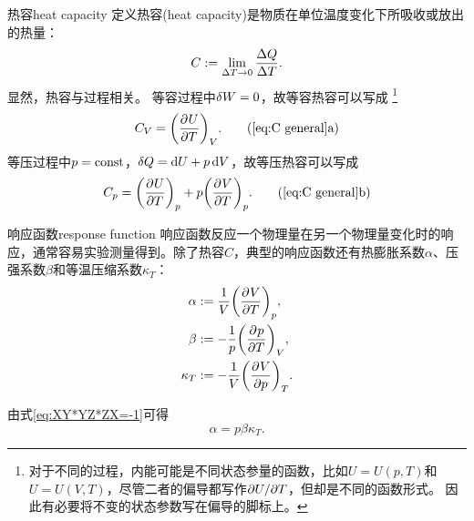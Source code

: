 \begin{definition}{热容}{heat capacity}
	定义热容(heat capacity)是物质在单位温度变化下所吸收或放出的热量：
	\begin{equation}
		\label{eq:C general}
		C:=\lim_{\D T\to0}\frac{\D Q}{\D T}.
	\end{equation}
	显然，热容与过程相关。
	等容过程中$\vd W=0$，故等容热容可以写成
	\footnote{对于不同的过程，内能可能是不同状态参量的函数，比如$U=U(p,T)$和$U=U(V,T)$，尽管二者的偏导都写作$\p U/\p T$，但却是不同的函数形式。
	因此有必要将不变的状态参数写在偏导的脚标上。}
	\begin{equation}
		\label{eq:C_V}
		C_V=\pu[V]UT.
		\tag{\ref{eq:C general}a}
	\end{equation}
	等压过程中$p=\const$，$\vd Q=\d U+p\d V$，故等压热容可以写成
	\begin{equation}
		\label{eq:C_p}
		C_p=\pu[p]UT+p\pu[p]VT.
		\tag{\ref{eq:C general}b}
	\end{equation}
\end{definition}

\begin{definition}
	{响应函数}{response function}
	响应函数反应一个物理量在另一个物理量变化时的响应，通常容易实验测量得到。除了热容$C$，典型的响应函数还有热膨胀系数$\alpha$、压强系数$\beta$和等温压缩系数$\kappa_T$：
	\begin{subequations}
		\begin{align}
			\alpha&:=\frac1V\pu[p]VT,\\
			\beta&:=-\frac1p\pu[V]pT,\\
			\kappa_T&:=-\frac1V\pu[T]Vp.
		\end{align}
	\end{subequations}
\end{definition}

\begin{corollary}
	由式\eqref{eq:XY*YZ*ZX=-1}可得
	\begin{equation}
		\alpha=p\beta\kappa_T.
	\end{equation}
\end{corollary}



